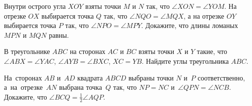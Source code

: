 \begin{problems}
\item Внутри острого угла $XOY$ взяты точки $M$ и $N$ так, что $\angle XON = \angle YOM$. На отрезке $OX$ выбирается точка $Q$ так, что $\angle NQO = \angle MQX$, а на отрезке $OY$ выбирается точка $P$ так, что $\angle NPO = \angle MPY$. Докажите, что длины ломаных $MPN$ и $MQN$ равны.

\item В треугольнике $ABC$ на сторонах $AC$ и $BC$ взяты точки $X$ и $Y$ такие, что $\angle ABX = \angle YAC$, $\angle AYB = \angle BXC$, $XC = YB$. Найдите углы треугольника $ABC$.

\item На~сторонах $AB$ и~$AD$ квадрата $ABCD$ выбраны точки $N$ и~$P$ соответственно,
а~на~отрезке~$AN$ выбрана точка~$Q$ так, что $NP = NC$
и~$\angle QPN = \angle NCB$.
Докажите, что $\angle BCQ = \frac{1}{2} \angle AQP$.


\end{problems}